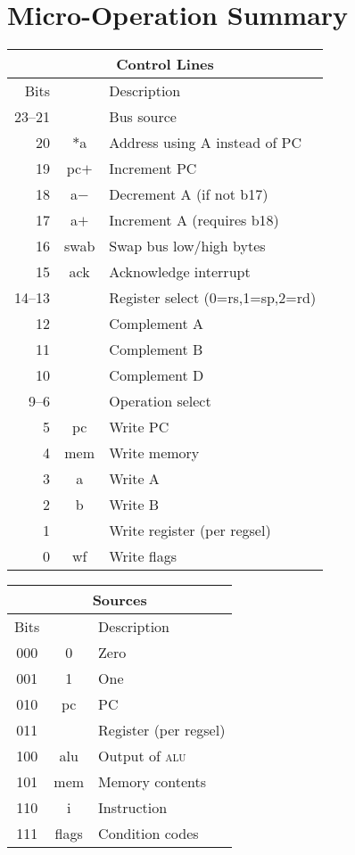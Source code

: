 \documentclass[11pt]{book}
\begin{document}

\chapter{Micro-Operation Summary}
\begin{multicols}{2}\noindent
\begin{tabular}{rcl}
  \toprule
  \multicolumn{3}{c}{\textbf{Control Lines}}\\\midrule
  Bits&&Description\\\midrule
  23--21&&Bus source\\
  20&\(\ast\)a&Address using A instead of PC\\
  19&pc\(+\)&Increment PC\\
  18&a\(-\)&Decrement A (if not b17)\\
  17&a\(+\)&Increment A (requires b18)\\
  16&swab&Swap bus low/high bytes\\
  15&ack&Acknowledge interrupt\\
  14--13&&Register select (0=rs,1=sp,2=rd)\\
  12&&Complement A\\
  11&&Complement B\\
  10&&Complement D\\
  9--6&&Operation select\\
  5&pc&Write PC\\
  4&mem&Write memory\\
  3&a&Write A\\
  2&b&Write B\\
  1&&Write register (per regsel)\\
  0&wf&Write flags\\\bottomrule
\end{tabular}

\vspace{\baselineskip}\noindent
\begin{tabular}{ccl}
  \toprule
  \multicolumn{3}{c}{\textbf{Sources}}\\\midrule
  Bits&&Description\\\midrule
  000&0&Zero\\
  001&1&One\\
  010&pc&PC\\
  011&&Register (per regsel)\\
  100&alu&Output of \textsc{alu}\\
  101&mem&Memory contents\\
  110&i&Instruction\\
  111&flags&Condition codes\\
  \bottomrule
\end{tabular}


\end{multicols}
\end{document}
